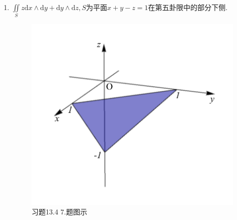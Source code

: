 \documentclass[12pt,UTF8,fleqn]{ctexart}
\newcommand{\Int}[4]{\varint\nolimits_{#1}^{#2}#3\mathrm d#4}
\newcommand{\md}[1]{\mathrm d#1}
\newcommand{\BSIInt}[2]{\iint\limits_{#1}#2}
\begin{document}
\begin{enumerate}
$\therefore\md\bm S=(A,B,C)\md\theta\md z=(a\cos\theta,a\sin\theta,0)\md\theta\md z=(\md y\wedge\md z,\md z\wedge\md x,\md x\wedge\md y)$,

$\therefore\BSIInt S{x\md y\wedge\md z+z\md x\wedge\md y}=\BSIInt D{a\cos\theta\cdot a\cos\theta\md\theta\md z+z\cdot0}=a^2\Int0{\frac\pi2}{\cos^2\theta}\theta\Int0h{}z=\frac\pi4a^2h$.

方法2：曲面$S$的正向单位法向量可以表示为$\bm n=\frac1a(x,y,0)$,

$\therefore\md\bm S=\bm n\md S=\frac1a(x,y,0)\md S=(\md y\wedge\md z,\md z\wedge\md x,\md x\wedge\md y)$,

$\therefore\BSIInt S{x\md y\wedge\md z+z\md x\wedge\md y}=\BSIInt S{x\cdot\frac1ax\md S+z\cdot0}=\frac1a\BSIInt S{x^2\md S}$,

$\because$曲面$S$关于平面$y=x$对称,

$\therefore$上式$=\frac1a\frac12\BSIInt S{(x^2+y^2)\md S}=\frac1{2a}\BSIInt S{a^2\md S}=\frac{a^2}{2a}\BSIInt S{\md S}=\frac a2\cdot\frac14\cdot2\pi a\cdot h=\frac\pi4a^2h$.

\item$\BSIInt S{z\md x\wedge\md y+\md y\wedge\md z},S$为平面$x+y-z=1$在第五卦限中的部分下侧.

\begin{figure}[H]
\begin{center}
\includegraphics[height=0.5\textheight]{Figures23/Fig13-4-7.pdf}
\end{center}
\caption{习题13.4 7.题图示}
\label{13-4-7}
\end{figure}


\end{enumerate}
\end{document}
